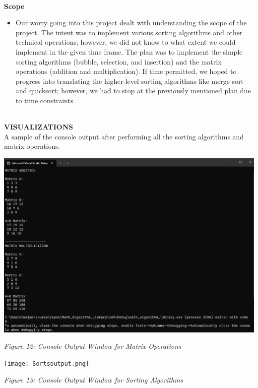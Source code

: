\documentclass[twoside]{article}
\begin{document}
\noindent \\ \textbf{Scope}
\begin{itemize}
\item Our worry going into this project dealt with understanding the scope of the project. The intent was to implement various sorting algorithms and other technical operations; however, we did not know to what extent we could implement in the given time frame. The plan was to implement the simple sorting algorithms (bubble, selection, and insertion) and the matrix operations (addition and multiplication). If time permitted, we hoped to progress into translating the higher-level sorting algorithms like merge sort and quicksort; however, we had to stop at the previously mentioned plan due to time constraints.
\end{itemize}


\noindent \\ \textbf{VISUALIZATIONS}
\\A sample of the console output after performing all the sorting algorithms and matrix operations.\\
\centerline{\includegraphics[scale=0.5]{images/matrixoperations.png}}
\begin{center}\textit{Figure 12: Console Output Window for Matrix Operations}\end{center}
\centerline{\texttt{[image: Sortsoutput.png]}}
\begin{center}\textit{Figure 13: Console Output Window for Sorting Algorithms}\end{center}
\end{document}
